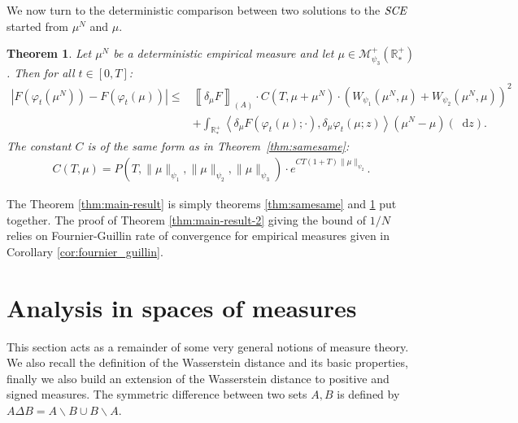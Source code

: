 \documentclass[11pt,a4paper]{article}
\newcommand{\RRP}{\mathbb{R}^+_*}
\newcommand{\MC}{\mathcal{M}}
\newcommand{\SCE}{\emph{SCE}}
\newcommand{\A}{(A)}
\newcommand{\dd}{\mathop{}\!\mathrm{d}}
\newtheorem{theorem}{Theorem}[section]
\begin{document}
\medskip

We now turn to the deterministic comparison between two solutions to the $\SCE$ started from $\mu^N$ and $\mu$.

\begin{theorem}\label{thm:difdif}
    Let $\mu^N$ be a deterministic empirical measure and let $\mu \in \MC^+_{\psi_3}(\RRP)$. Then for all $t \in [0,T]$:
    \begin{align*}
        \left| F\left(\varphi_t(\mu^N)\right) - F\left(\varphi_t(\mu)\right) \right|
        \leq& \left\llbracket \delta_\mu F \right\rrbracket_{\A} \cdot C(T,\mu + \mu^N) \cdot \left(W_{\psi_1}(\mu^N,\mu) + W_{\psi_2}(\mu^N,\mu)\right)^2 \\
        &+ \int_{\RRP} \left\langle \delta_\mu F\left(\varphi_t \left(\mu\right);\cdot \right), \delta_\mu \varphi_t\left(\mu;z \right) \right\rangle \left(\mu^N - \mu\right)(\dd z).
    \end{align*}
    The constant $C$ is of the same form as in Theorem~\ref{thm:samesame}:
    \begin{align*}
        C(T,\mu) = P\left(T,\|\mu\|_{\psi_1},\|\mu\|_{\psi_2},\|\mu\|_{\psi_3}\right) 
        \cdot e^{CT(1 + T)\|\mu\|_{\psi_2}}.
    \end{align*}
\end{theorem}
The Theorem \ref{thm:main-result} is simply theorems \ref{thm:samesame} and \ref{thm:difdif} put together. The proof of Theorem \ref{thm:main-result-2} giving the bound of $1/N$ relies on Fournier-Guillin rate of convergence for empirical measures given in Corollary \ref{cor:fournier_guillin}.

\section{Analysis in spaces of measures}\label{section:analysis-measures}
This section acts as a remainder of some very general notions of measure theory. We also recall the definition of the Wasserstein distance and its basic properties, finally we also build an extension of the Wasserstein distance to positive and signed measures. The symmetric difference between two sets $A,B$ is defined by $A\Delta B = A\backslash B \cup B\backslash A$.
\end{document}
